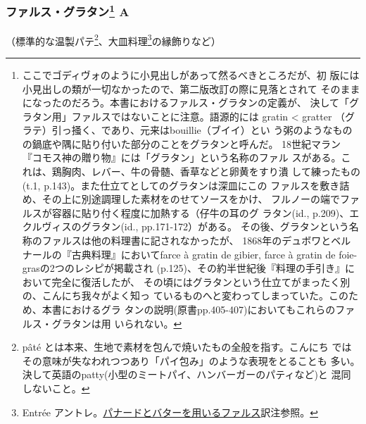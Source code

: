 \begin{recette}

\hypertarget{farce-gratin-a}{%
\subsubsection[ファルス・グラタン
A]{\texorpdfstring{ファルス・グラタン\footnote{ここでゴディヴォのように小見出しがあって然るべきところだが、初
  版には小見出しの類が一切なかったので、第二版改訂の際に見落とされて
  そのままになったのだろう。本書におけるファルス・グラタンの定義が、
  決して「グラタン用」ファルスではないことに注意。語源的には gratin
  \textless{} gratter
  （グラテ）引っ掻く、であり、元来はbouillie（ブイイ）とい
  う粥のようなものの鍋底や隅に貼り付いた部分のことをグラタンと呼んだ。
  18世紀マラン『コモス神の贈り物』には「グラタン」という名称のファル
  スがある。これは、鶏胸肉、レバー、牛の骨髄、香草などと卵黄をすり潰
  して練ったもの(t.1, p.143)。また仕立てとしてのグラタンは深皿にこの
  ファルスを敷き詰め、その上に別途調理した素材をのせてソースをかけ、
  フルノーの端でファルスが容器に貼り付く程度に加熱する（仔牛の耳のグ
  ラタン(id., p.209)、エクルヴィスのグラタン(id., pp.171-172）がある。
  その後、グラタンという名称のファルスは他の料理書に記されなかったが、
  1868年のデュボワとベルナールの『古典料理』においてfarce à gratin de
  gibier, farce à gratin de foie-grasの2つのレシピが掲載され
  (p.125)、その約半世紀後『料理の手引き』において完全に復活したが、
  その頃にはグラタンという仕立てがまったく別の、こんにち我々がよく知っ
  ているものへと変わってしまっていた。このため、本書におけるグラ
  タンの説明(原書pp.405-407)においてもこれらのファルス・グラタンは用
  いられない。} A}{ファルス・グラタン A}}\label{farce-gratin-a}}



（標準的な温製パテ\footnote{pâté
  とは本来、生地で素材を包んで焼いたもの全般を指す。こんにち
  ではその意味が失なわれつつあり「パイ包み」のような表現をとることも
  多い。決して英語のpatty(小型のミートパイ、ハンバーガーのパティなど)と
  混同しないこと。}、大皿料理\footnote{Entrée
  アントレ。\protect\hyperlink{panade-a}{パナードとバターを用いるファルス}訳注参照。}の縁飾りなど）


\end{recette}
